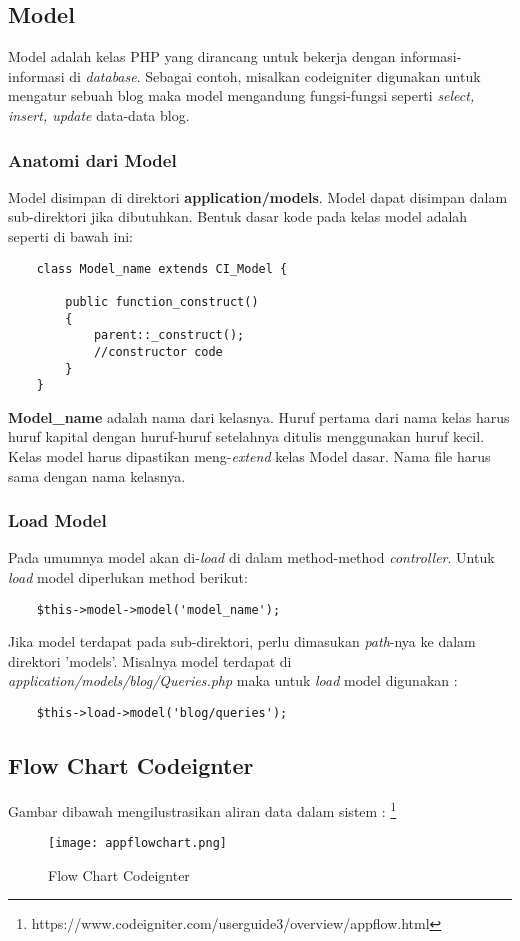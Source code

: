\subsection{Model}
Model adalah kelas PHP yang dirancang untuk bekerja dengan informasi-informasi di \textit{database}. Sebagai contoh, misalkan codeigniter digunakan untuk mengatur sebuah blog maka model mengandung fungsi-fungsi seperti \textit{select, insert, update }data-data blog.

\subsubsection{Anatomi dari Model}
Model disimpan di direktori \textbf{application/models}. Model dapat disimpan dalam sub-direktori jika dibutuhkan. Bentuk dasar kode pada kelas model adalah seperti di bawah ini:
\begin{lstlisting}
	class Model_name extends CI_Model {
	
		public function_construct()
		{
			parent::_construct();
			//constructor code
		}
	}
\end{lstlisting}
\textbf{Model\_name} adalah nama dari kelasnya. Huruf pertama dari nama kelas harus huruf kapital dengan huruf-huruf setelahnya ditulis menggunakan huruf kecil. Kelas model harus dipastikan meng-\textit{extend} kelas Model dasar. Nama file harus sama dengan nama kelasnya.

\subsubsection{Load Model}
Pada umumnya model akan di-\textit{load} di dalam method-method \textit{controller}. Untuk \textit{load} model diperlukan method berikut:
\begin{lstlisting}
	$this->model->model('model_name');
\end{lstlisting}
Jika model terdapat pada sub-direktori, perlu dimasukan \textit{path}-nya ke dalam direktori 'models'. Misalnya model terdapat di \textit{application/models/blog/Queries.php} maka untuk \textit{load} model digunakan :
\begin{lstlisting}
	$this->load->model('blog/queries');
\end{lstlisting}


\subsection{Flow Chart Codeignter}
Gambar dibawah mengilustrasikan aliran data dalam sistem : \footnote{https://www.codeigniter.com/userguide3/overview/appflow.html}
\begin{figure} [H]
	\centering  
	\texttt{[image: appflowchart.png]}  
	\caption[Flow Chart Codeignter]{Flow Chart Codeignter} 
	\label{fig:flow-chart-codeigniter} 
\end{figure}

